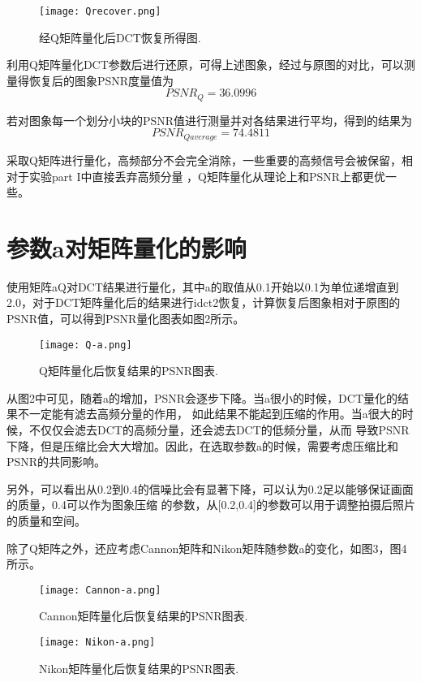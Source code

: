 \documentclass{ctexart}
\begin{document}
\begin{figure}
\centering
\texttt{[image: Qrecover.png]}
\caption{经Q矩阵量化后DCT恢复所得图.}
\end{figure}

利用Q矩阵量化DCT参数后进行还原，可得上述图象，经过与原图的对比，可以测量得恢复后的图象PSNR度量值为
\begin{equation}
PSNR_Q = 36.0996
\end{equation}

若对图象每一个划分小块的PSNR值进行测量并对各结果进行平均，得到的结果为
\begin{equation}
PSNR_{Qaverage} = 74.4811
\end{equation}

采取Q矩阵进行量化，高频部分不会完全消除，一些重要的高频信号会被保留，相对于实验part I中直接丢弃高频分量
，Q矩阵量化从理论上和PSNR上都更优一些。

\section{参数a对矩阵量化的影响}
使用矩阵aQ对DCT结果进行量化，其中a的取值从0.1开始以0.1为单位递增直到2.0，对于DCT矩阵量化后的结果进行idct2恢复，计算恢复后图象相对于原图的PSNR值，可以得到PSNR量化图表如图2所示。

\begin{figure}
\centering
\texttt{[image: Q-a.png]}
\caption{Q矩阵量化后恢复结果的PSNR图表.}
\end{figure}
从图2中可见，随着a的增加，PSNR会逐步下降。当a很小的时候，DCT量化的结果不一定能有滤去高频分量的作用，
如此结果不能起到压缩的作用。当a很大的时候，不仅仅会滤去DCT的高频分量，还会滤去DCT的低频分量，从而
导致PSNR下降，但是压缩比会大大增加。因此，在选取参数a的时候，需要考虑压缩比和PSNR的共同影响。

另外，可以看出从0.2到0.4的信噪比会有显著下降，可以认为0.2足以能够保证画面的质量，0.4可以作为图象压缩
的参数，从[0.2,0.4]的参数可以用于调整拍摄后照片的质量和空间。

除了Q矩阵之外，还应考虑Cannon矩阵和Nikon矩阵随参数a的变化，如图3，图4所示。
\begin{figure}
\centering
\texttt{[image: Cannon-a.png]}
\caption{Cannon矩阵量化后恢复结果的PSNR图表.}
\end{figure}

\begin{figure}
\centering
\texttt{[image: Nikon-a.png]}
\caption{Nikon矩阵量化后恢复结果的PSNR图表.}
\end{figure}
\end{document}
